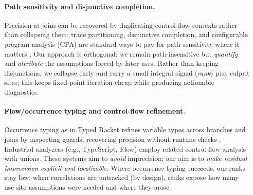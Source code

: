 \paragraph{Path sensitivity and disjunctive completion.}
Precision at joins can be recovered by duplicating control-flow contexts rather than collapsing them: 
trace partitioning, disjunctive completion, and configurable program analysis (CPA) are standard ways to pay for path sensitivity where it matters \cite{MauborgneRival2005,BeyerHenzinger2007}.
Our approach is orthogonal: we remain path-insensitive but \emph{quantify} and \emph{attribute} the assumptions forced by later uses.
Rather than keeping disjunctions, we collapse early and carry a small integral signal (\emph{rank}) plus culprit sites; this keeps fixed-point iteration cheap while producing actionable diagnostics.

\paragraph{Flow/occurrence typing and control-flow refinement.}
Occurrence typing as in Typed Racket refines variable types across branches and joins by inspecting guards, recovering precision without runtime checks \cite{TobinHochstadtFelleisen2008}.
Industrial analyzers (e.g., TypeScript, Flow) employ related control-flow analysis with unions.
These systems aim to \emph{avoid} imprecision; our aim is to \emph{make residual imprecision explicit and localizable}.
Where occurrence typing succeeds, our ranks stay low; when correlations are untracked (by design), ranks expose how many use-site assumptions were needed and where they arose.
